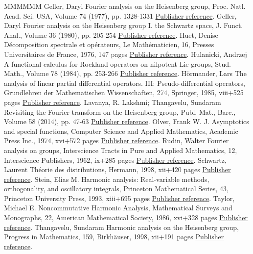 \documentclass[11pt]{article}
\theoremstyle{definition}
\numberwithin{equation}{section}
\numberwithin{figure}{section}
\numberwithin{table}{section}
\begin{document}
\begin{thebibliography}{MMMMMM}
 Geller, Daryl Fourier analysis on the Heisenberg group, Proc. Natl. Acad. Sci. USA, Volume 74 (1977), pp. 1328-1331 \href{https://ahl.centre-mersenne.org/item/AHL_2018__1__1_0/#geller}{Publisher reference}.
 Geller, Daryl Fourier analysis on the Heisenberg group I. the Schwartz space, J. Funct. Anal., Volume 36 (1980), pp. 205-254 \href{https://ahl.centre-mersenne.org/item/AHL_2018__1__1_0/#geller2}{Publisher reference}.
 Huet, Denise Décomposition spectrale et opérateurs, Le Mathématicien, 16, Presses Universitaires de France, 1976, 147 pages \href{https://ahl.centre-mersenne.org/item/AHL_2018__1__1_0/#huet}{Publisher reference}.
 Hulanicki, Andrzej A functional calculus for Rockland operators on nilpotent Lie groups, Stud. Math., Volume 78 (1984), pp. 253-266 \href{https://ahl.centre-mersenne.org/item/AHL_2018__1__1_0/#hula}{Publisher reference}.
 Hörmander, Lars The analysis of linear partial differential operators. III: Pseudo-differential operators, Grundlehren der Mathematischen Wissenschaften, 274, Springer, 1985, viii+525 pages \href{https://ahl.centre-mersenne.org/item/AHL_2018__1__1_0/#H}{Publisher reference}.
 Lavanya, R. Lakshmi; Thangavelu, Sundaram Revisiting the Fourier transform on the Heisenberg group, Publ. Mat., Barc., Volume 58 (2014), pp. 47-63 \href{https://ahl.centre-mersenne.org/item/AHL_2018__1__1_0/#thangavelu2}{Publisher reference}.
 Olver, Frank W. J. Asymptotics and special functions, Computer Science and Applied Mathematics, Academic Press Inc., 1974, xvi+572 pages \href{https://ahl.centre-mersenne.org/item/AHL_2018__1__1_0/#O}{Publisher reference}.
 Rudin, Walter Fourier analysis on groups, Interscience Tracts in Pure and Applied Mathematics, 12, Interscience Publishers, 1962, ix+285 pages \href{https://ahl.centre-mersenne.org/item/AHL_2018__1__1_0/#rudin}{Publisher reference}.
 Schwartz, Laurent Théorie des distributions, Hermann, 1998, xii+420 pages \href{https://ahl.centre-mersenne.org/item/AHL_2018__1__1_0/#S}{Publisher reference}.
 Stein, Elias M. Harmonic analysis: Real-variable methods, orthogonality, and oscillatory integrals, Princeton Mathematical Series, 43, Princeton University Press, 1993, xiii+695 pages \href{https://ahl.centre-mersenne.org/item/AHL_2018__1__1_0/#stein2}{Publisher reference}.
 Taylor, Michael E. Noncommutative Harmonic Analysis, Mathematical Surveys and Monographs, 22, American Mathematical Society, 1986, xvi+328 pages \href{https://ahl.centre-mersenne.org/item/AHL_2018__1__1_0/#taylor1}{Publisher reference}.
 Thangavelu, Sundaram Harmonic analysis on the Heisenberg group, Progress in Mathematics, 159, Birkhäuser, 1998, xii+191 pages \href{https://ahl.centre-mersenne.org/item/AHL_2018__1__1_0/#thangavelu}{Publisher reference}.
\end{thebibliography}
\end{document}
